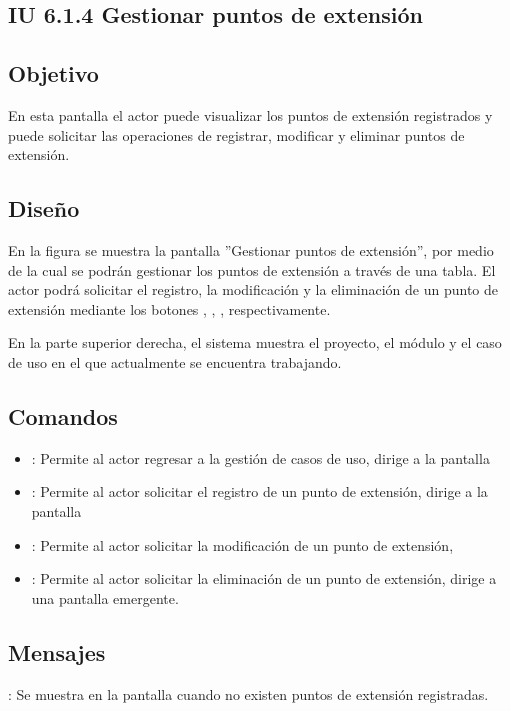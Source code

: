\subsection{IU 6.1.4 Gestionar puntos de extensión}

\subsection{Objetivo}
	En esta pantalla el actor puede visualizar los puntos de extensión registrados y puede solicitar las operaciones de registrar, modificar y eliminar puntos de extensión.
\subsection{Diseño}
	En la figura  se muestra la pantalla ''Gestionar puntos de extensión'', por medio de la cual se podrán gestionar los puntos de extensión a través de una tabla. El actor podrá solicitar el registro, la modificación y la eliminación de un punto de extensión mediante los botones , \editar, \eliminar, respectivamente.
	
	En la parte superior derecha, el sistema muestra el proyecto, el módulo y el caso de uso en el que actualmente se encuentra trabajando.

\subsection{Comandos}
\begin{itemize}
	\item {}: Permite al actor regresar a la gestión de casos de uso, dirige a la pantalla 
	\item {}: Permite al actor solicitar el registro de un punto de extensión, dirige a la pantalla 
	\item \editar [Modificar]: Permite al actor solicitar la modificación de un punto de extensión, 
	\item \eliminar [Eliminar]: Permite al actor solicitar la eliminación de un punto de extensión, dirige a una pantalla emergente.
\end{itemize}

\subsection{Mensajes}

\begin{Citemize}
	\item {}: Se muestra en la pantalla  cuando no existen puntos de extensión registradas.
\end{Citemize}
